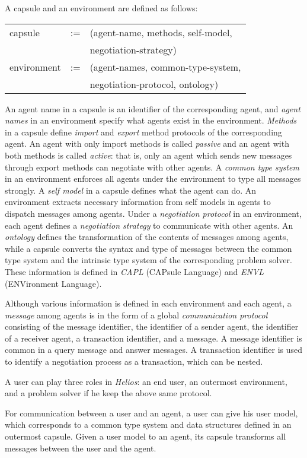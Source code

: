 A capsule and an environment are defined as follows:
\begin{center}
\begin{tabular}{lll}
 capsule	   & := & (agent-name, methods, self-model, \\
 & &  negotiation-strategy)\\
 environment & := & (agent-names, common-type-system, \\
 & &  negotiation-protocol, ontology)
\end{tabular}
\end{center}
An {agent name} in a capsule is an identifier of the corresponding
agent, and {\em agent names} in an environment specify what agents
exist in the environment.
{\em Methods} in a capsule define {\em import} and {\em export}
method protocols of the corresponding agent.
An agent with only import methods is called {\em passive} and an agent
with both methods is called {\em active}: that is, only an agent which
sends new messages through export methods can negotiate with other
agents.
A {\em common type system} in an environment enforces all agents under
the environment to type all messages strongly.
A {\em self model} in a capsule defines what the agent can do.
An environment extracts necessary information from self models in
agents to dispatch messages among agents.
Under a {\em negotiation protocol} in an environment, each agent
defines a {\em negotiation strategy} to communicate with other agents.
An {\em ontology} defines the transformation of the contents of
messages among agents, while a capsule converts the syntax and type of
messages between the common type system and the intrinsic type system
of the corresponding problem solver.
These information is defined in {\em CAPL} (CAPsule Language) and
{\em ENVL} (ENVironment Language).

Although various information is defined in each environment and each
agent, a {\em message} among agents is in the form of a global {\em
communication protocol} consisting of the message identifier, the
identifier of a sender agent, the identifier of a receiver agent, a
transaction identifier, and a message.
A message identifier is common in a query message and answer messages.
A transaction identifier is used to identify a negotiation process as
a transaction, which can be nested.

A user can play three roles in {\em Helios}: an end user, an outermost
environment, and a problem solver if he keep the above same protocol.

For communication between a user and an agent, a user can give his
user model, which corresponds to a common type system and data
structures defined in an outermost capsule.
Given a user model to an agent, its capsule transforms all messages
between the user and the agent.

